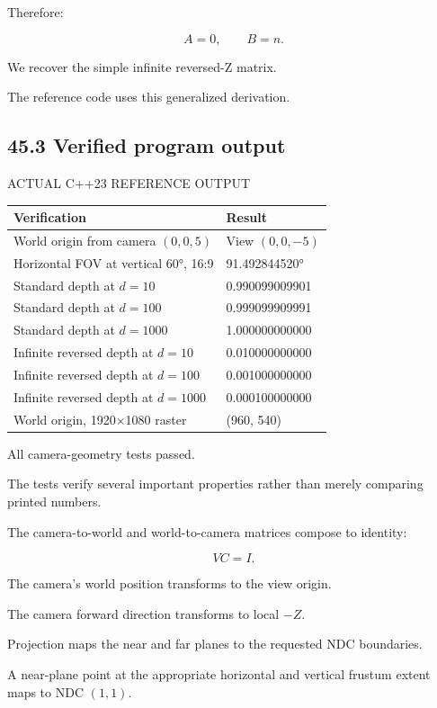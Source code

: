 Therefore:

\[
 A=0,\qquad B=n.
\]

We recover the simple infinite reversed-Z matrix.

The reference code uses this generalized derivation.

\subsection{45.3 Verified program output}\label{02-foundations-ii-ch037-verified-program-output}

ACTUAL C++23 REFERENCE OUTPUT

{\def\LTcaptype{none} %
\begin{longtable}[]{@{}ll@{}}
\toprule\noalign{}
Verification & Result \\
\midrule\noalign{}
\endhead
\bottomrule\noalign{}
\endlastfoot
World origin from camera \((0,0,5)\) & View \((0,0,-5)\) \\
Horizontal FOV at vertical 60°, 16:9 & 91.492844520° \\
Standard depth at \(d=10\) & 0.990099009901 \\
Standard depth at \(d=100\) & 0.999099909991 \\
Standard depth at \(d=1000\) & 1.000000000000 \\
Infinite reversed depth at \(d=10\) & 0.010000000000 \\
Infinite reversed depth at \(d=100\) & 0.001000000000 \\
Infinite reversed depth at \(d=1000\) & 0.000100000000 \\
World origin, 1920×1080 raster & (960, 540) \\
\end{longtable}
}

All camera-geometry tests passed.

The tests verify several important properties rather than merely comparing printed numbers.

The camera-to-world and world-to-camera matrices compose to identity:

\[
 \boxed{VC=I}.
\]

The camera's world position transforms to the view origin.

The camera forward direction transforms to local \(-Z\).

Projection maps the near and far planes to the requested NDC boundaries.

A near-plane point at the appropriate horizontal and vertical frustum extent maps to NDC \((1,1)\).


